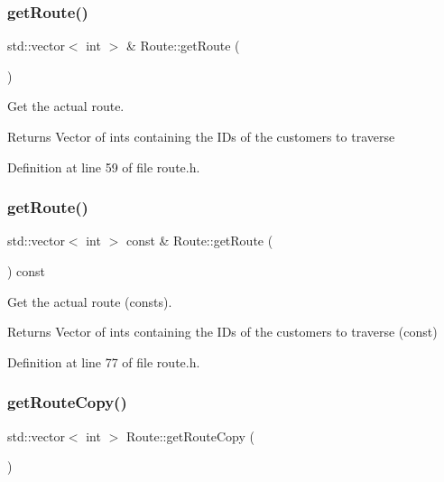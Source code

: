 \subsubsection{\texorpdfstring{get\+Route()}{getRoute()}\hspace{0.1cm}{\footnotesize\ttfamily [1/2]}}
{\footnotesize\ttfamily std\+::vector$<$ int $>$ \& Route\+::get\+Route (\begin{DoxyParamCaption}{ }\end{DoxyParamCaption})\hspace{0.3cm}{\ttfamily [inline]}}

Get the actual route. \begin{DoxyReturn}{Returns}
Vector of ints containing the I\+Ds of the customers to traverse 
\end{DoxyReturn}


Definition at line 59 of file route.\+h.

\mbox{\label{class_route_a151bbafcfc1afd47bda7c2b6c6567c1e}} 
\subsubsection{\texorpdfstring{get\+Route()}{getRoute()}\hspace{0.1cm}{\footnotesize\ttfamily [2/2]}}
{\footnotesize\ttfamily std\+::vector$<$ int $>$ const  \& Route\+::get\+Route (\begin{DoxyParamCaption}{ }\end{DoxyParamCaption}) const\hspace{0.3cm}{\ttfamily [inline]}}

Get the actual route (consts). \begin{DoxyReturn}{Returns}
Vector of ints containing the I\+Ds of the customers to traverse (const) 
\end{DoxyReturn}


Definition at line 77 of file route.\+h.

\mbox{\label{class_route_adbff1ea9d40933cbb79886efd758ef0c}} 
\subsubsection{\texorpdfstring{get\+Route\+Copy()}{getRouteCopy()}}
{\footnotesize\ttfamily std\+::vector$<$ int $>$ Route\+::get\+Route\+Copy (\begin{DoxyParamCaption}{ }\end{DoxyParamCaption})\hspace{0.3cm}{\ttfamily [inline]}}

